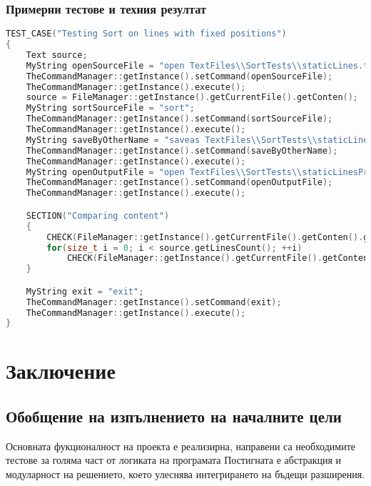 \documentclass[a4paper,12pt]{article}
\begin{document}
\subsubsection{Примерни тестове и техния резултат}
\begin{lstlisting}[language=C++]
    TEST_CASE("Testing Sort on lines with fixed positions")
{
	Text source;
	MyString openSourceFile = "open TextFiles\\SortTests\\staticLines.txt";
	TheCommandManager::getInstance().setCommand(openSourceFile);
	TheCommandManager::getInstance().execute();
	source = FileManager::getInstance().getCurrentFile().getConten();
	MyString sortSourceFile = "sort";
	TheCommandManager::getInstance().setCommand(sortSourceFile);
	TheCommandManager::getInstance().execute();
	MyString saveByOtherName = "saveas TextFiles\\SortTests\\staticLinesProgramOutput.txt";
	TheCommandManager::getInstance().setCommand(saveByOtherName);
	TheCommandManager::getInstance().execute();
	MyString openOutputFile = "open TextFiles\\SortTests\\staticLinesProgramOutput.txt";
	TheCommandManager::getInstance().setCommand(openOutputFile);
	TheCommandManager::getInstance().execute();

	SECTION("Comparing content")
	{
		CHECK(FileManager::getInstance().getCurrentFile().getConten().getLinesCount() == source.getLinesCount());
		for(size_t i = 0; i < source.getLinesCount(); ++i)
			CHECK(FileManager::getInstance().getCurrentFile().getConten().getLine(i + 1) == source.getLine(i + 1));
	}

	MyString exit = "exit";
	TheCommandManager::getInstance().setCommand(exit);
	TheCommandManager::getInstance().execute();
}
\end{lstlisting}


\begin{figure}[h]
     \label{fig:system-diagram}
 \end{figure}
 

\section{Заключение}
\subsection{Обобщение на изпълнението на началните цели}
Основната фукционалност на проекта е реализирна, направени са необходимите тестове за голяма част от логиката на програмата
Постигната е абстракция и модуларност на решението, което улеснява интегрирането на бъдещи разширения.
\end{document}
